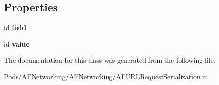 \subsection*{Properties}
\begin{DoxyCompactItemize}
\item 
\mbox{\label{interface_a_f_query_string_pair_a56a6a5052194b3fd862dc7eed618a646}} 
id {\bfseries field}
\item 
\mbox{\label{interface_a_f_query_string_pair_a8aafaee91dab273d51a9448bfb4e7676}} 
id {\bfseries value}
\end{DoxyCompactItemize}


The documentation for this class was generated from the following file\+:\begin{DoxyCompactItemize}
\item 
Pods/\+A\+F\+Networking/\+A\+F\+Networking/A\+F\+U\+R\+L\+Request\+Serialization.\+m\end{DoxyCompactItemize}
